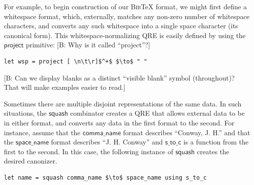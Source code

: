 \documentclass[acmsmall,review,anonymous]{acmart}
\newcommand{\FINISH}[3]{\ifdraft\textcolor{#1}{[#2: #3]}\fi}
\newcommand{\bcp}[1]{\FINISH{dkred}{B}{#1}}
\newcommand{\kw}[1]{\ensuremath{\mathsf{#1}}}
\newcommand{\codefont}[1]{\ensuremath{\mathsf{#1}}}
\newcommand{\bibtex}{\textsc{Bib}\TeX{}}
\begin{document}
For example, to begin construction of our \bibtex{} format, we might
first define a whitespace format, which, externally, matches
any non-zero number of whitespace characters, and converts
any such whitespace into a single space character (its canonical form).
This whitespace-normalizing QRE is easily defined by using the \kw{project} primitive: \bcp{Why is it called ``project''?}

\begin{lstlisting}
let wsp = project [ \n\t\r]$^+$ $\to$ " "
\end{lstlisting}
\bcp{Can we display blanks as a distinct ``visible blank'' symbol
  (throughout)?  That will make examples easier to read.}

Sometimes there are multiple disjoint representations of the same data.
In such situations, the \kw{squash} combinator creates a QRE that
allows external data to be in either format, and converts any
data in the first format to the second. 
For instance, assume that
the \codefont{comma\_name} format describes ``Conway, J. H.''
and that the \codefont{space\_name} format describes ``J. H. Conway''
and \codefont{s\_to\_c} is a function from the first to the second.  In this case,
the following instance of \kw{squash} creates the desired canonizer.


\begin{lstlisting}
let name = squash comma_name $\to$ space_name using s_to_c
\end{lstlisting}
\end{document}
